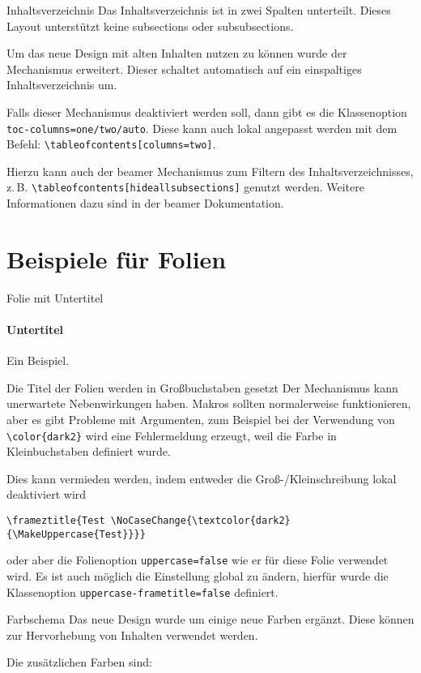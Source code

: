 \documentclass[
	german,%
	accentcolor=9c,%
]{tudabeamer}
\newcommand*{\code}[1]{\texttt{#1}}
\begin{document}
\begin{frame}{Inhaltsverzeichnis}
	Das Inhaltsverzeichnis ist in zwei Spalten unterteilt. Dieses Layout unterstützt keine subsections oder subsubsections.

	Um das neue Design mit alten Inhalten nutzen zu können wurde der Mechanismus erweitert. Dieser schaltet automatisch auf ein einspaltiges Inhaltsverzeichnis um.

	Falls dieser Mechanismus deaktiviert werden soll, dann gibt es die Klassenoption \code{toc-columns=one/two/auto}. Diese kann auch lokal angepasst werden mit dem Befehl:
	\code{\textbackslash{}tableofcontents[columns=two]}.

	Hierzu kann auch der beamer Mechanismus zum Filtern des Inhaltsverzeichnisses, z.\,B. \code{\textbackslash{}tableofcontents[hideallsubsections]} genutzt werden. Weitere Informationen dazu sind in der beamer Dokumentation.
\end{frame}

\section{Beispiele für Folien}

\begin{frame}{Folie mit Untertitel}
	\framesubtitle{Untertitel}
	Ein Beispiel.
\end{frame}

\begin{frame}[fragile,uppercase=false]{Die Titel der Folien werden in Großbuchstaben gesetzt}
	Der Mechanismus kann unerwartete Nebenwirkungen haben.
	Makros sollten normalerweise funktionieren, aber es gibt Probleme mit Argumenten, zum Beispiel bei der Verwendung von \verb+\color{dark2}+ wird eine Fehlermeldung erzeugt, weil die Farbe in Kleinbuchstaben definiert wurde.

	Dies kann vermieden werden, indem entweder die Groß-/Kleinschreibung lokal deaktiviert wird
\begin{verbatim}
\frameztitle{Test \NoCaseChange{\textcolor{dark2}{\MakeUppercase{Test}}}}
\end{verbatim}
	oder aber die Folienoption \verb+uppercase=false+ wie er für diese Folie  verwendet wird.
	Es ist auch möglich die Einstellung global zu ändern, hierfür wurde die Klassenoption \verb+uppercase-frametitle=false+ definiert.
\end{frame}

\begin{frame}{Farbschema}
	Das neue Design wurde um einige neue Farben ergänzt. Diese können zur Hervorhebung von Inhalten verwendet werden.

	Die zusätzlichen Farben sind:

	\renewcommand*{\do}[1]{TUDa-####1: \textcolor{TUDa-####1}{\rule{1cm}{\ht\strutbox}}\par}
\end{frame}
\end{document}
